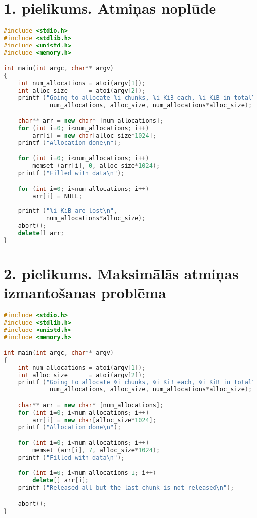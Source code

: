 ﻿

\chapter{1. pielikums. Atmiņas noplūde}

    
   
\begin{lstlisting}[language=C++]
#include <stdio.h>
#include <stdlib.h>
#include <unistd.h>
#include <memory.h>

int main(int argc, char** argv)
{
	int num_allocations = atoi(argv[1]);
	int alloc_size      = atoi(argv[2]);
	printf ("Going to allocate %i chunks, %i KiB each, %i KiB in total\n",
	         num_allocations, alloc_size, num_allocations*alloc_size);

	char** arr = new char* [num_allocations];
	for (int i=0; i<num_allocations; i++)
		arr[i] = new char[alloc_size*1024];
	printf ("Allocation done\n");

	for (int i=0; i<num_allocations; i++)
		memset (arr[i], 0, alloc_size*1024);
	printf ("Filled with data\n");

	for (int i=0; i<num_allocations; i++)
		arr[i] = NULL;
        
	printf ("%i KiB are lost\n", 
			num_allocations*alloc_size);
	abort();
	delete[] arr;
} 
\end{lstlisting}

\newpage
\chapter{2. pielikums. Maksimālās atmiņas izmantošanas problēma}


\begin{lstlisting}[language=C++]
#include <stdio.h>
#include <stdlib.h>
#include <unistd.h>
#include <memory.h>

int main(int argc, char** argv)
{
	int num_allocations = atoi(argv[1]);
	int alloc_size      = atoi(argv[2]);
	printf ("Going to allocate %i chunks, %i KiB each, %i KiB in total\n",
	         num_allocations, alloc_size, num_allocations*alloc_size);

	char** arr = new char* [num_allocations];
	for (int i=0; i<num_allocations; i++)
		arr[i] = new char[alloc_size*1024];
	printf ("Allocation done\n");

	for (int i=0; i<num_allocations; i++)
		memset (arr[i], 7, alloc_size*1024);
	printf ("Filled with data\n");

	for (int i=0; i<num_allocations-1; i++)
		delete[] arr[i];
	printf ("Released all but the last chunk is not released\n");

	abort();
} 
\end{lstlisting}

